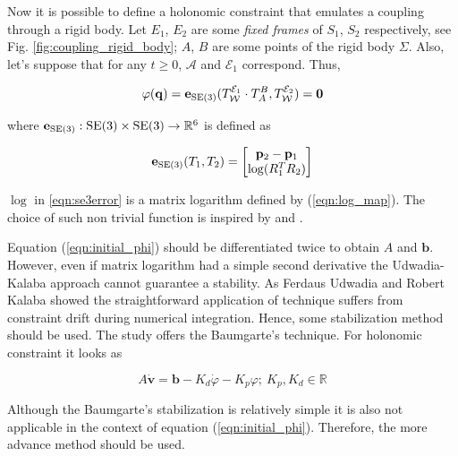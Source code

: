 Now it is possible to define a holonomic constraint that emulates a coupling 
through a rigid body. Let $E_1$, $E_2$ are some \emph{fixed frames} of 
$S_1$, $S_2$ respectively, see Fig. \ref{fig:coupling_rigid_body}; $A$, $B$ are 
some points of the rigid body $\Sigma$. Also, let's suppose that for any $t \geq 0$, 
$\mathcal{A}$ and $\mathcal{E}_1$ correspond. Thus, 

\begin{equation}
    \varphi(\mathbf{q}) = \mathbf{e}_{\text{SE}(3)}(
        T_{\mathcal{W}}^{\mathcal{E}_1} \cdot
        T_{A}^{B},
        T_{\mathcal{W}}^{\mathcal{E}_2}
    ) = \mathbf{0}
    \label{eqn:initial_phi}
\end{equation}

where $\mathbf{e}_{\text{SE}(3)}: \text{SE}(3) \times \text{SE}(3) \rightarrow \mathbb{R}^6$ is defined as

\begin{equation}
    \mathbf{e}_{\text{SE}(3)}(T_1, T_2) = 
    \begin{bmatrix}
        \mathbf{p}_2 - \mathbf{p}_1 \\
        \log (R_1^T R_2)
    \end{bmatrix}
    \label{eqn:se3error}
\end{equation}

$\log$ in \ref{eqn:se3error} is a matrix logarithm defined by 
(\ref{eqn:log_map}). The choice of such non trivial function is 
inspired by \cite{OutFeedbackStabForOrbRob} and \cite{ANonlinearObserverUsingPose}. 

Equation (\ref{eqn:initial_phi}) should be differentiated twice to obtain $A$ and 
$\mathbf{b}$. However, even if matrix logarithm had a simple second derivative 
the Udwadia-Kalaba approach cannot guarantee a stability. As Ferdaus Udwadia and 
Robert Kalaba showed \cite{udwadia1996analytical} the straightforward application 
of technique suffers from constraint drift during numerical integration. Hence, 
some stabilization method should be used. The study \cite{udwadia1996analytical} 
offers the Baumgarte's technique. For holonomic constraint it looks as

\begin{equation}
    A \dot{\mathbf{v}} = \mathbf{b} - K_d \dot{\varphi} - K_p \varphi; \:
    K_p, K_d \in \mathbb{R}
    \label{eqn:baumgrate_stab}
\end{equation}

Although the Baumgarte's stabilization is relatively simple it is also not applicable 
in the context of equation (\ref{eqn:initial_phi}). Therefore, the more advance 
method should be used. 

